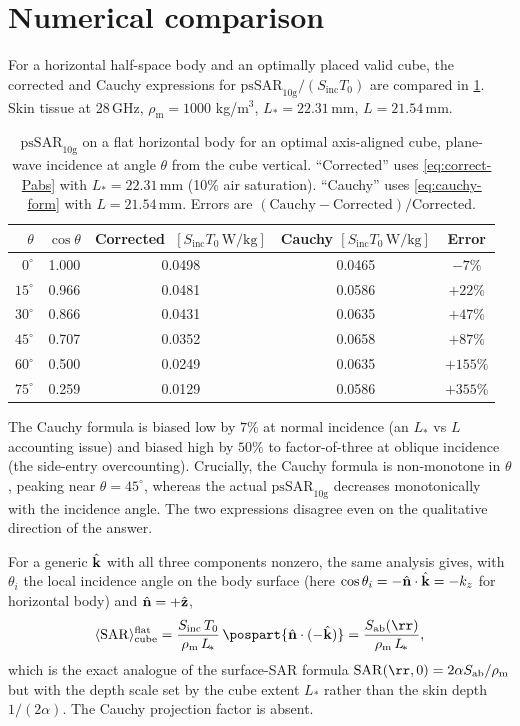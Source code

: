 \documentclass[11pt,a4paper]{article}
\theoremstyle{definition}
\theoremstyle{remark}
\newcommand{\Sab}{S_{\mathrm{ab}}}
\newcommand{\Sinc}{S_{\mathrm{inc}}}
\newcommand{\Tzero}{T_0}
\newcommand{\nhat}{\hat{\vb{n}}}
\newcommand{\khat}{\hat{\vb{k}}}
\newcommand{\SAR}{\ensuremath{\mathrm{SAR}}}
\newcommand{\psSAR}{\ensuremath{\mathrm{psSAR}_{10\mathrm{g}}}}
\newcommand{\rhom}{\rho_{\mathrm{m}}}
\newcommand{\Lact}{L_{\!*}}
\begin{document}
\section{Numerical comparison}
\label{sec:numerics}

For a horizontal half-space body and an optimally placed valid cube,
the corrected and Cauchy expressions for $\psSAR/(\Sinc\Tzero)$ are
compared in \cref{tab:compare}. Skin tissue at 28\,GHz, $\rhom=1000$
kg/m$^3$, $\Lact=22.31$\,mm, $L=21.54$\,mm.

\begin{table}[ht]
\centering
\caption{$\psSAR$ on a flat horizontal body for an optimal axis-aligned
cube, plane-wave incidence at angle $\theta$ from the cube vertical.
``Corrected'' uses \cref{eq:correct-Pabs} with $\Lact=22.31$\,mm
(10\% air saturation). ``Cauchy'' uses \cref{eq:cauchy-form} with
$L=21.54$\,mm. Errors are
$(\text{Cauchy}-\text{Corrected})/\text{Corrected}$.}
\label{tab:compare}
\begin{tabular}{rcccc}
\toprule
$\theta$ & $\cos\theta$ & Corrected
  $\;[\Sinc\Tzero\,\mathrm{W/kg}]$
  & Cauchy $[\Sinc\Tzero\,\mathrm{W/kg}]$
  & Error \\
\midrule
$0^\circ$  & 1.000 & 0.0498 & 0.0465 & $-7\%$ \\
$15^\circ$ & 0.966 & 0.0481 & 0.0586 & $+22\%$ \\
$30^\circ$ & 0.866 & 0.0431 & 0.0635 & $+47\%$ \\
$45^\circ$ & 0.707 & 0.0352 & 0.0658 & $+87\%$ \\
$60^\circ$ & 0.500 & 0.0249 & 0.0635 & $+155\%$ \\
$75^\circ$ & 0.259 & 0.0129 & 0.0586 & $+355\%$ \\
\bottomrule
\end{tabular}
\end{table}

The Cauchy formula is biased low by $7\%$ at normal incidence (an
$\Lact$ vs $L$ accounting issue) and biased high by $50\%$ to
factor-of-three at oblique incidence (the side-entry overcounting).
Crucially, the Cauchy formula is non-monotone in $\theta$, peaking
near $\theta=45^\circ$, whereas the actual $\psSAR$ decreases
monotonically with the incidence angle. The two expressions
disagree even on the qualitative direction of the answer.

For a generic $\khat$ with all three components nonzero, the same
analysis gives, with $\theta_i$ the local incidence angle on the
body surface (here $\cos\theta_i = -\nhat\cdot\khat = -k_z$ for
horizontal body) and $\nhat=+\hat{\vb z}$,
\begin{equation}\label{eq:correct-3d}
  \langle\SAR\rangle^{\mathrm{flat}}_{\mathrm{cube}}
  = \frac{\Sinc\,\Tzero}{\rhom\,\Lact}\,
    \pospart{\nhat\cdot(-\khat)}
  = \frac{\Sab(\rr)}{\rhom\,\Lact},
\end{equation}
which is the exact analogue of the surface-SAR formula
$\SAR(\rr,0)=2\alpha\Sab/\rhom$ but with the depth scale set by the
cube extent $\Lact$ rather than the skin depth $1/(2\alpha)$. The
Cauchy projection factor is absent.
\end{document}

